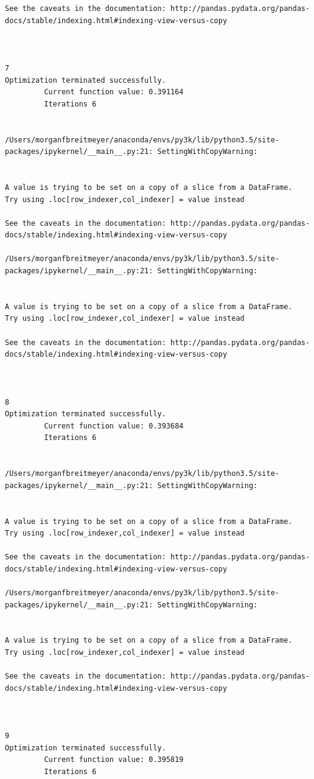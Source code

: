 \begin{lstlisting}
See the caveats in the documentation: http://pandas.pydata.org/pandas-docs/stable/indexing.html#indexing-view-versus-copy



7
Optimization terminated successfully.
         Current function value: 0.391164
         Iterations 6


/Users/morganfbreitmeyer/anaconda/envs/py3k/lib/python3.5/site-packages/ipykernel/__main__.py:21: SettingWithCopyWarning:


A value is trying to be set on a copy of a slice from a DataFrame.
Try using .loc[row_indexer,col_indexer] = value instead

See the caveats in the documentation: http://pandas.pydata.org/pandas-docs/stable/indexing.html#indexing-view-versus-copy

/Users/morganfbreitmeyer/anaconda/envs/py3k/lib/python3.5/site-packages/ipykernel/__main__.py:21: SettingWithCopyWarning:


A value is trying to be set on a copy of a slice from a DataFrame.
Try using .loc[row_indexer,col_indexer] = value instead

See the caveats in the documentation: http://pandas.pydata.org/pandas-docs/stable/indexing.html#indexing-view-versus-copy



8
Optimization terminated successfully.
         Current function value: 0.393684
         Iterations 6


/Users/morganfbreitmeyer/anaconda/envs/py3k/lib/python3.5/site-packages/ipykernel/__main__.py:21: SettingWithCopyWarning:


A value is trying to be set on a copy of a slice from a DataFrame.
Try using .loc[row_indexer,col_indexer] = value instead

See the caveats in the documentation: http://pandas.pydata.org/pandas-docs/stable/indexing.html#indexing-view-versus-copy

/Users/morganfbreitmeyer/anaconda/envs/py3k/lib/python3.5/site-packages/ipykernel/__main__.py:21: SettingWithCopyWarning:


A value is trying to be set on a copy of a slice from a DataFrame.
Try using .loc[row_indexer,col_indexer] = value instead

See the caveats in the documentation: http://pandas.pydata.org/pandas-docs/stable/indexing.html#indexing-view-versus-copy



9
Optimization terminated successfully.
         Current function value: 0.395819
         Iterations 6



\end{lstlisting}

